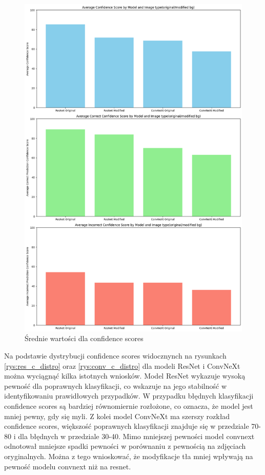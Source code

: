\begin{figure}
	\centering\includegraphics[width=.9\textwidth]{img/confidence_avg}
	\caption{Średnie wartości dla confidence scores}  
    \label{rys:confidence_avg}
\end{figure}
\newpage
Na podstawie dystrybucji confidence scores widocznynch na rysunkach \ref*{rys:res_c_distro} oraz \ref*{rys:conv_c_distro} dla modeli ResNet i ConvNeXt można wyciągnąć kilka istotnych wniosków. Model ResNet wykazuje wysoką pewność dla poprawnych 
klasyfikacji, co wskazuje na jego stabilność w identyfikowaniu prawidłowych przypadków. W przypadku błędnych klasyfikacji confidence scores są bardziej równomiernie rozłożone, co oznacza, że model jest mniej pewny, gdy się myli. Z kolei 
model ConvNeXt ma szerszy rozkład confidence scores, większość poprawnych klasyfikacji znajduje się w przedziale 70-80 i dla błędnych w przedziale 30-40. Mimo mniejszej pewności model convnext odnotował mniejsze spadki pewności w porównaniu
z pewnością na zdjęciach oryginalnych. Można z tego wnioskować, że modyfikacje tła mniej wpływają na pewność modelu convnext niż na resnet.

